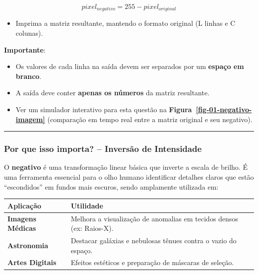 \documentclass[
  portuguese,
  letterpaper,
  openany,
  oneside,
  12pt,
  a4paper]{book}
\providecommand{\tightlist}{%
  \setlength{\itemsep}{0pt}\setlength{\parskip}{0pt}}
\begin{document}
\[pixel_{negativo} = 255 - pixel_{original}\]

\begin{itemize}
\tightlist
\item
  Imprima a matriz resultante, mantendo o formato original (L linhas e C
  colunas).
\end{itemize}

 \textbf{Importante}:

\begin{itemize}
\tightlist
\item
  Os valores de cada linha na saída devem ser separados por um
  \textbf{espaço em branco}.
\item
  A saída deve conter \textbf{apenas os números} da matriz resultante.
\item
  Ver um simulador interativo para esta questão na
  \textbf{Figura~\ref{fig-01-negativo-imagem}} (comparação em tempo real
  entre a matriz original e seu negativo).
\end{itemize}

\begin{center}\rule{0.5\linewidth}{0.5pt}\end{center}

\subsubsection{\texorpdfstring{ Por que isso importa? --
Inversão de
Intensidade}{ Por que isso importa? -- Inversão de Intensidade}}\label{por-que-isso-importa-inversuxe3o-de-intensidade}

O \textbf{negativo} é uma transformação linear básica que inverte a
escala de brilho. É uma ferramenta essencial para o olho humano
identificar detalhes claros que estão ``escondidos'' em fundos mais
escuros, sendo amplamente utilizada em:

\begin{longtable}[]{@{}
  >{\raggedright\arraybackslash}p{}
  >{\raggedright\arraybackslash}p{}@{}}
\toprule\noalign{}
\begin{minipage}[b]{\linewidth}\raggedright
Aplicação
\end{minipage} & \begin{minipage}[b]{\linewidth}\raggedright
Utilidade
\end{minipage} \\
\midrule\noalign{}
\endhead
\bottomrule\noalign{}
\endlastfoot
\textbf{Imagens Médicas} & Melhora a visualização de anomalias em
tecidos densos (ex: Raios-X). \\
\textbf{Astronomia} & Destacar galáxias e nebulosas tênues contra o
vazio do espaço. \\
\textbf{Artes Digitais} & Efeitos estéticos e preparação de máscaras de
seleção. \\
\end{longtable}
\end{document}
